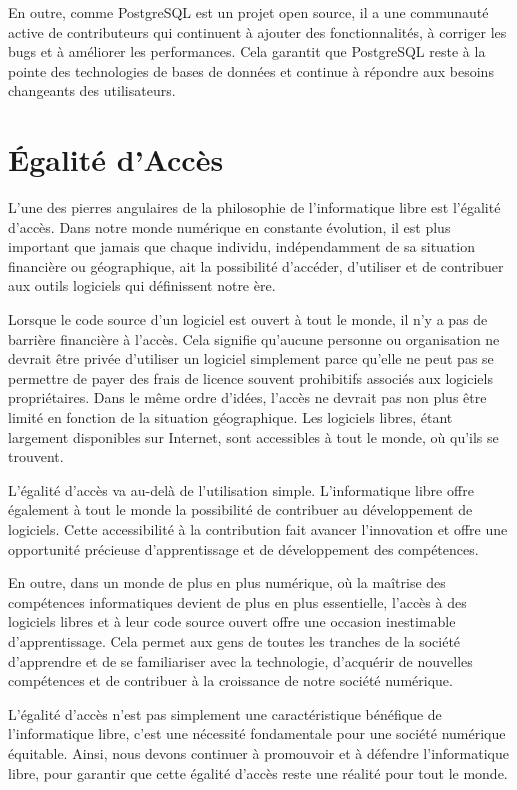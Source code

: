 En outre, comme PostgreSQL est un projet open source, il a une communauté active de contributeurs qui continuent à ajouter des fonctionnalités, à corriger les bugs et à améliorer les performances. Cela garantit que PostgreSQL reste à la pointe des technologies de bases de données et continue à répondre aux besoins changeants des utilisateurs. \cite{PostgreSQL}

\section{Égalité d'Accès}
L'une des pierres angulaires de la philosophie de l'informatique libre est l'égalité d'accès. Dans notre monde numérique en constante évolution, il est plus important que jamais que chaque individu, indépendamment de sa situation financière ou géographique, ait la possibilité d'accéder, d'utiliser et de contribuer aux outils logiciels qui définissent notre ère.

Lorsque le code source d'un logiciel est ouvert à tout le monde, il n'y a pas de barrière financière à l'accès. Cela signifie qu'aucune personne ou organisation ne devrait être privée d'utiliser un logiciel simplement parce qu'elle ne peut pas se permettre de payer des frais de licence souvent prohibitifs associés aux logiciels propriétaires. Dans le même ordre d'idées, l'accès ne devrait pas non plus être limité en fonction de la situation géographique. Les logiciels libres, étant largement disponibles sur Internet, sont accessibles à tout le monde, où qu'ils se trouvent.

L'égalité d'accès va au-delà de l'utilisation simple. L'informatique libre offre également à tout le monde la possibilité de contribuer au développement de logiciels. Cette accessibilité à la contribution fait avancer l'innovation et offre une opportunité précieuse d'apprentissage et de développement des compétences.

En outre, dans un monde de plus en plus numérique, où la maîtrise des compétences informatiques devient de plus en plus essentielle, l'accès à des logiciels libres et à leur code source ouvert offre une occasion inestimable d'apprentissage. Cela permet aux gens de toutes les tranches de la société d'apprendre et de se familiariser avec la technologie, d'acquérir de nouvelles compétences et de contribuer à la croissance de notre société numérique.

L'égalité d'accès n'est pas simplement une caractéristique bénéfique de l'informatique libre, c'est une nécessité fondamentale pour une société numérique équitable. Ainsi, nous devons continuer à promouvoir et à défendre l'informatique libre, pour garantir que cette égalité d'accès reste une réalité pour tout le monde.


